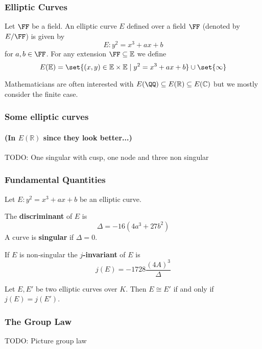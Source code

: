 \documentclass{beamer}
\begin{document}
\begin{frame}
    \frametitle{Elliptic Curves}
    \begin{definition}
        Let $\FF$ be a field. An elliptic curve $E$ defined over a field $\FF$ (denoted by $E/\FF$) is given by 
        \[ E: y^2 = x^3 + a x + b \]
        for $a, b \in \FF$. For any extension $\FF \subseteq \mathbb{E}$ we define
        \[ E(\mathbb{E}) = \set{(x, y) \in \mathbb{E} \times \mathbb{E} \mid y^2 = x^3 + a x + b } \cup \set{ \infty } \]
    \end{definition}
    Mathematicians are often interested with $E(\QQ) \subseteq E(\mathbb{R}) \subseteq E(\mathbb{C})$ but we mostly consider the finite case.
\end{frame}

\begin{frame}
    \frametitle{Some elliptic curves}
    \framesubtitle{(In $E(\mathbb{R})$ since they look better...)}
    TODO: One singular with cusp, one node and three non singular
\end{frame}

\begin{frame}
    \frametitle{Fundamental Quantities}
    \begin{definition}
        Let $E: y^2 = x^3 + a x + b$ be an elliptic curve.

        The \textbf{discriminant} of $E$ is 
            \[ \Delta = -16 (4 a^3 + 27 b^2) \] 
        A curve is \textbf{singular} if $\Delta = 0$.

        If $E$ is non-singular the $j$\textbf{-invariant} of $E$ is
            \[ j(E) = -1728 \frac{(4 A)^3}{\Delta} \]
    \end{definition}
    \begin{theorem}
        Let $E, E'$ be two elliptic curves over $K$. Then $E \cong E'$ if and only if $j(E) = j(E')$. 
    \end{theorem}
\end{frame}

\begin{frame}
    \frametitle{The Group Law} 
    TODO: Picture group law
\end{frame}
\end{document}
